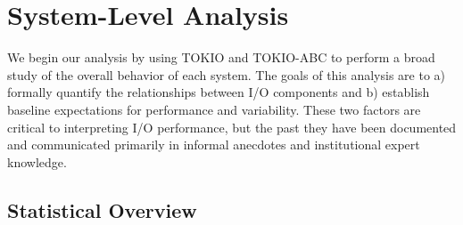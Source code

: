 \section{System-Level Analysis} \label{sec:results}

We begin our analysis by using TOKIO and TOKIO-ABC to perform a broad
study of the overall behavior of each system.  The goals of this analysis
are to a) formally quantify the relationships between I/O components
and b) establish baseline expectations for performance and variability.
These two factors are critical to interpreting I/O performance, but the
past they have been documented and communicated primarily in informal
anecdotes and institutional expert knowledge.



\subsection{Statistical Overview} \label{sec:results/overview}

